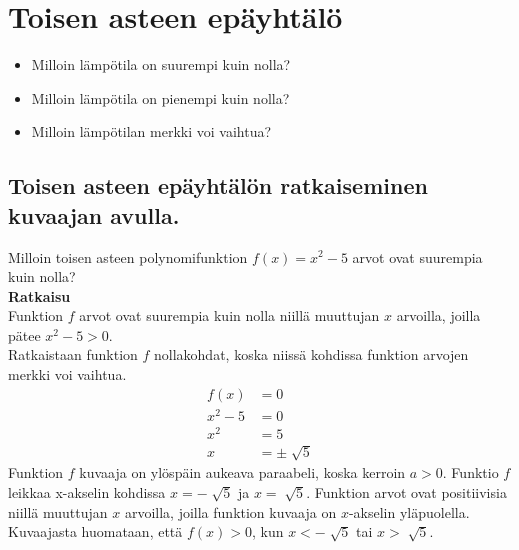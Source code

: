 \chapter{Toisen asteen epäyhtälö}
\begin{esimerkki}
\begin{itemize}
\item{Milloin lämpötila on suurempi kuin nolla?}
\item{Milloin lämpötila on pienempi kuin nolla?}
\item{Milloin lämpötilan merkki voi vaihtua?} 
\end{itemize}
\end{esimerkki}
\section{Toisen asteen epäyhtälön ratkaiseminen kuvaajan avulla.}
\begin{esimerkki}
Milloin toisen asteen polynomifunktion $f(x)=x^2-5$ arvot ovat suurempia kuin nolla?  \\
\textbf{Ratkaisu} \\
Funktion $f$ arvot ovat suurempia kuin nolla niillä muuttujan $x$ arvoilla, joilla pätee $x^2-5>0$. \\
Ratkaistaan funktion $f$ nollakohdat, koska niissä kohdissa funktion arvojen merkki voi vaihtua.
\begin{align*}
f(x)&=0 \\
x^2-5&=0 \\
x^2&=5 \\
x&=\pm \sqrt[]{5}
\end{align*}
Funktion $f$ kuvaaja on ylöspäin aukeava paraabeli, koska kerroin $a>0$.
Funktio $f$ leikkaa x-akselin kohdissa $x=-\sqrt[]{5}$ ja $x=\sqrt[]{5}$.
Funktion arvot ovat positiivisia niillä muuttujan $x$ arvoilla, joilla funktion kuvaaja on $x$-akselin yläpuolella.
Kuvaajasta huomataan, että $f(x)>0$, kun $x<-\sqrt[]{5}$ tai $x>\sqrt[]{5}$. 
\end{esimerkki}
